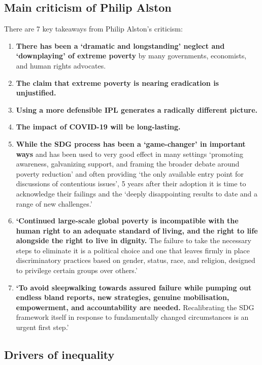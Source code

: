 \documentclass[../summary.tex]{subfiles}
\begin{document}
\subsection{Main criticism of Philip Alston}

There are 7 key takeaways from Philip Alston's criticism:
\begin{enumerate}
	\item \textbf{There has been a `dramatic and longstanding' neglect and `downplaying' of extreme poverty} by many governments, economists, and human rights advocates.
	\item \textbf{The claim that extreme poverty is nearing eradication is unjustified.}
	\item \textbf{Using a more defensible IPL generates a radically different picture.}
	\item \textbf{The impact of COVID-19 will be long-lasting.}
	\item \textbf{While the SDG process has been a `game-changer' in important ways} and has been used to very good effect in many settings `promoting awareness, galvanizing support, and framing the broader debate around poverty reduction' and often providing `the only available entry point for discussions of contentious issues', 5 years after their adoption it is time to acknowledge their failings and the `deeply disappointing results to date and a range of new challenges.'
	\item \textbf{`Continued large-scale global poverty is incompatible with the human right to an adequate standard of living, and the right to life alongside the right to live in dignity.} The failure to take the necessary steps to eliminate it is a political choice and one that leaves firmly in place discriminatory practices based on gender, status, race, and religion, designed to privilege certain groups over others.'
	\item \textbf{`To avoid sleepwalking towards assured failure while pumping out endless bland reports, new strategies, genuine mobilisation, empowerment, and accountability are needed.} Recalibrating the SDG framework itself in response to fundamentally changed circumstances is an urgent first step.'
\end{enumerate}

\subsection{Drivers of inequality}
\end{document}
